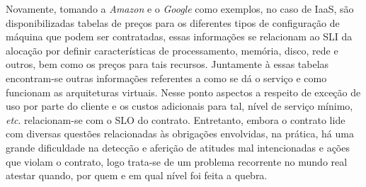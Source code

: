 %
Novamente, tomando a \textit{Amazon} \cite{nuvem_sla:precos_amazon} e o \textit{Google} \cite{nuvem_sla:precos_google} como exemplos, no caso de \ac{IaaS}, são disponibilizadas tabelas de preços para os diferentes tipos de configuração de máquina que podem ser contratadas, essas informações se relacionam ao \ac{SLI} da alocação por definir características de processamento, memória, disco, rede e outros, bem como os preços para tais recursos. Juntamente à essas tabelas encontram-se outras informações referentes a como se dá o serviço e como funcionam as arquiteturas virtuais. Nesse ponto aspectos a respeito de exceção de uso por parte do cliente e os custos adicionais para tal, nível de serviço mínimo, \textit{etc}. relacionam-se com o \ac{SLO} do contrato.
%
Entretanto, embora o contrato lide com diversas questões relacionadas às obrigações envolvidas, na prática, há uma grande dificuldade na detecção e aferição de atitudes mal intencionadas e ações que violam o contrato, logo trata-se de um problema recorrente no mundo real atestar quando, por quem e em qual nível foi feita a quebra.


